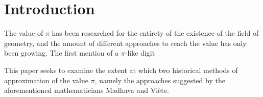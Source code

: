 \section{Introduction}


The value of $\pi$ has been researched for the entirety of the existence of the 
field of geometry, and the amount of different approaches to reach the value has 
only been growing. The first mention of a $\pi$-like digit


This paper seeks to examine the extent at which two historical methods of
approximation of the value $\pi$, namely the approaches suggested by the aforementioned 
mathematicians Madhava and Viète. 

